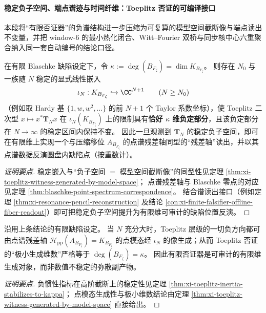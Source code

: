 \paragraph{稳定负子空间、端点谱迹与时间纤维：Toeplitz 否证的可编译接口}
本段将“有限否证器”的负谱结构进一步压缩为可复算的模型空间截断像与端点读出不变量，并把 window-\(6\) 的最小热化闭合、Witt--Fourier 双桥与同步核中心六重聚合纳入同一套自动编号的结论口径。

\begin{conclusion}\label{con:xi-toeplitz-compiled-model-space-truncation}
在有限 Blaschke 缺陷设定下，令 \(\kappa:=\deg(B_{F_{\zeta}})=\dim K_{B_{F_{\zeta}}}\)。
则存在 \(N_0\) 与一族随 \(N\) 稳定的显式线性嵌入
\[
\iota_N:K_{B_{F_{\zeta}}}\hookrightarrow \CC^{N+1}\qquad(N\ge N_0)
\]
（例如取 Hardy 基 \(\{1,w,w^2,\dots\}\) 的前 \(N{+}1\) 个 Taylor 系数坐标），使 Toeplitz 二次型
\(
x\mapsto x^\ast\mathbf{T}_N x
\)
在 \(\iota_N(K_{B_{F_{\zeta}}})\) 上的限制具有\textbf{恰好 \(\kappa\) 维负定部分}，且该负定部分在 \(N\to\infty\) 的稳定区间内保持不变。
因此一旦观测到 \(\mathbf{T}_N\) 的稳定负子空间，即可在有限维上实现一个与压缩移位 \(A_{B_{F_\zeta}}\) 的点谱残差轴同型的“残差轴”读出，并以其点谱数据反演圆盘内缺陷点（按重数计）。
\end{conclusion}
\begin{proof}[证明要点]
稳定嵌入与“负子空间 \(=\) 模型空间截断像”的同型性见定理 \ref{thm:xi-toeplitz-witness-generated-by-model-space}；
点谱残差轴与 Blaschke 零点的对应见定理 \ref{thm:blaschke-point-spectrum-correspondence}。
结合谱读出接口（例如定理 \ref{thm:xi-resonance-pencil-reconstruction} 及结论 \ref{con:xi-finite-falsifier-offline-fiber-readout}）即可把稳定负子空间提升为有限维可审计的缺陷位置反演。
\end{proof}

\begin{conclusion}\label{con:xi-toeplitz-witness-minimal-generator-axis}
沿用上条结论的有限缺陷设定。
当 \(N\) 充分大时，Toeplitz 层级的一切负方向都可由点谱残差轴
\(
\mathcal H_{\mathrm{pp}}(A_{B_{F_\zeta}})=K_{B_{F_\zeta}}
\)
的点模态经 \(\iota_N\) 的像生成；从而 Toeplitz 否证的“极小生成维数”严格等于
\(
\deg(B_{F_\zeta})=\kappa
\)。
因此有限否证器是可审计的有限维生成对象，而非数值不稳定的弥散副产物。
\end{conclusion}
\begin{proof}[证明要点]
负惯性指标在高阶截断上的稳定性见定理 \ref{thm:xi-toeplitz-inertia-stabilizes-to-kappa}；
点模态生成性与极小维数结论由定理 \ref{thm:xi-toeplitz-witness-generated-by-model-space} 直接给出。
\end{proof}

